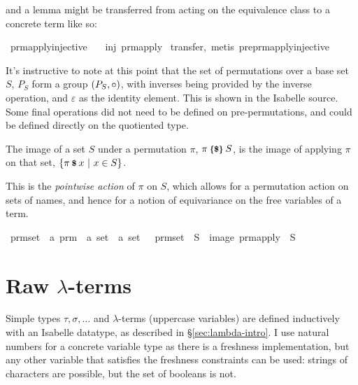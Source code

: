 and a lemma might be transferred from acting on the equivalence class to a concrete term like so:

\begin{implementation}
\isamarkupfalse%
\ prm{\isacharunderscore}apply{\isacharunderscore}injective{\isacharcolon}\isanewline
\ \ \ {\isachardoublequoteopen}inj\ {\isacharparenleft}prm{\isacharunderscore}apply\ {\isasympi}{\isacharparenright}{\isachardoublequoteclose}\isanewline
%
\isadelimproof
%
\endisadelimproof
%
\isatagproof
{}\isamarkupfalse%
{\isacharparenleft}transfer,\ metis\ preprm{\isacharunderscore}apply{\isacharunderscore}injective{\isacharparenright}%
\endisatagproof
\end{implementation}

It's instructive to note at this point that the set of permutations over a base set \(S\), \(P_S\) form a group \(\left(P_S, \circ\right)\), with inverses being provided by the inverse operation, and \(\varepsilon\) as the identity element.
This is shown in the Isabelle source.
Some final operations did not need to be defined on pre-permutations, and could be defined directly on the quotiented type.

\begin{definition}
The image of a set \(S\) under a permutation \(\pi\), \(\pi \mathbin{\textrm{\footnotesize{\textbf{\{\$\}}}}} S\), is the image of applying \(\pi\) on that set, \(\{\pi \mathbin{\textrm{\footnotesize{\textbf{\$}}}} x\ |\ x \in S\}\).
\end{definition}

This is the \emph{pointwise action} of \(\pi\) on \(S\), which allows for a permutation action on sets of names, and hence for a notion of equivariance on the free variables of a term.

\begin{implementation}
\isamarkupfalse%
\ prm{\isacharunderscore}set\ {\isacharcolon}{\isacharcolon}\ {\isachardoublequoteopen}{\isacharprime}a\ prm\ {\isasymRightarrow}\ {\isacharprime}a\ set\ {\isasymRightarrow}\ {\isacharprime}a\ set{\isachardoublequoteclose}\ \isanewline \ \ {\isachardoublequoteopen}prm{\isacharunderscore}set\ {\isasympi}\ S\ {\isasymequiv}\ image\ {\isacharparenleft}prm{\isacharunderscore}apply\ {\isasympi}{\isacharparenright}\ S{\isachardoublequoteclose}\isanewline
\end{implementation}

\section{Raw \(\lambda\)-terms}
\label{sec:raw-terms}
Simple types \(\tau, \sigma, \ldots\) and \(\lambda\)-terms (uppercase variables) are defined inductively with an Isabelle datatype, as described in \S\ref{sec:lambda-intro}.
I use natural numbers for a concrete variable type as there is a freshness implementation, but any other variable that satisfies the freshness constraints can be used: strings of characters are possible, but the set of booleans is not.

